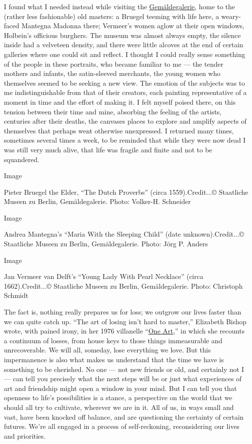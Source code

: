 I found what I needed instead while visiting the
\href{https://www.smb.museum/museen-einrichtungen/gemaeldegalerie/home/}{Gemäldegalerie},
home to the (rather less fashionable) old masters: a Bruegel teeming
with life here, a weary-faced Mantegna Madonna there; Vermeer's women
aglow at their open windows, Holbein's officious burghers. The museum
was almost always empty, the silence inside had a velveteen density, and
there were little alcoves at the end of certain galleries where one
could sit and reflect. I thought I could really sense something of the
people in these portraits, who became familiar to me --- the tender
mothers and infants, the satin-sleeved merchants, the young women who
themselves seemed to be seeking a new view. The emotion of the subjects
was to me indistinguishable from that of their creators, each painting
representative of a moment in time and the effort of making it. I felt
myself poised there, on this tension between their time and mine,
absorbing the feeling of the artists, centuries after their deaths, the
canvases places to explore and amplify aspects of themselves that
perhaps went otherwise unexpressed. I returned many times, sometimes
several times a week, to be reminded that while they were now dead I was
still very much alive, that life was fragile and finite and not to be
squandered.

Image

Pieter Bruegel the Elder, ``The Dutch Proverbs'' (circa 1559).Credit...©
Staatliche Museen zu Berlin, Gemäldegalerie. Photo: Volker-H. Schneider

Image

Andrea Mantegna's ``Maria With the Sleeping Child'' (date
unknown).Credit...© Staatliche Museen zu Berlin, Gemäldegalerie. Photo:
Jörg P. Anders

Image

Jan Vermeer van Delft's ``Young Lady With Pearl Necklace'' (circa
1662).Credit...© Staatliche Museen zu Berlin, Gemäldegalerie. Photo:
Christoph Schmidt

The fact is, nothing really prepares us for loss; we outgrow our lives
faster than we can quite catch up. ``The art of losing isn't hard to
master,'' Elizabeth Bishop wrote, with pained irony, in her 1976
villanelle
``\href{https://www.poetryfoundation.org/poems/47536/one-art}{One
Art},'' in which she recounts a continuum of losses, from house keys to
those things immeasurable and unrecoverable. We will all, someday, lose
everything we love. But this impermanence is also what makes us
understand that the time we have is something to be cherished. No one
--- not new friends or old, and certainly not I --- can tell you
precisely what the next steps will be or just what experiences of art
and friendship might open a window in your mind. But I can tell you that
openness to life's possibilities is a stance, a perspective on the world
that we should all try to cultivate, wherever we are in it. All of us,
in ways small and vast, have been knocked off balance, and are
questioning the certainty of certain futures. We're all engaged in a
process of self-reckoning, reconsidering our lives and priorities.

